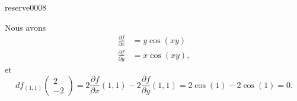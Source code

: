 

\begin{corrige}{reserve0008}

    Nous avons
    \begin{subequations}
        \begin{align}
            \frac{ \partial f }{ \partial x }&=y\cos(xy)\\
            \frac{ \partial f }{ \partial y }&=x\cos(xy),
        \end{align}
    \end{subequations}
    et
    \begin{equation}
        df_{(1,1)}\begin{pmatrix}
            2    \\ 
            -2    
        \end{pmatrix}=2\frac{ \partial f }{ \partial x }(1,1)-2\frac{ \partial f }{ \partial y }(1,1)=2\cos(1)-2\cos(1)=0.
    \end{equation}

\end{corrige}
